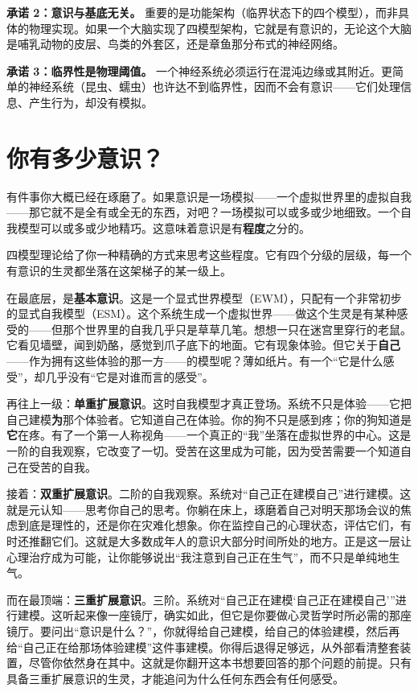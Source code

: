 \documentclass[11pt, twoside, openright]{book}
\begin{document}
\textbf{承诺 2：意识与基底无关。} 重要的是功能架构（临界状态下的四个模型），而非具体的物理实现。如果一个大脑实现了四模型架构，它就是有意识的，无论这个大脑是哺乳动物的皮层、鸟类的外套区，还是章鱼那分布式的神经网络。

\textbf{承诺 3：临界性是物理阈值。} 一个神经系统必须运行在混沌边缘或其附近。更简单的神经系统（昆虫、蠕虫）也许达不到临界性，因而不会有意识------它们处理信息、产生行为，却没有模拟。

\section*{你有多少意识？}

有件事你大概已经在琢磨了。如果意识是一场模拟------一个虚拟世界里的虚拟自我------那它就不是全有或全无的东西，对吧？一场模拟可以或多或少地细致。一个自我模型可以或多或少地精巧。这意味着意识是有\textbf{程度}之分的。

四模型理论给了你一种精确的方式来思考这些程度。它有四个分级的层级，每一个有意识的生灵都坐落在这架梯子的某一级上。

在最底层，是\textbf{基本意识}。这是一个显式世界模型（EWM），只配有一个非常初步的显式自我模型（ESM）。这个系统生成一个虚拟世界------做这个生灵是有某种感受的------但那个世界里的自我几乎只是草草几笔。想想一只在迷宫里穿行的老鼠。它看见墙壁，闻到奶酪，感觉到爪子底下的地面。它有现象体验。但它关于\textbf{自己}------作为拥有这些体验的那一方------的模型呢？薄如纸片。有一个“它是什么感受”，却几乎没有“它是对谁而言的感受”。

再往上一级：\textbf{单重扩展意识}。这时自我模型才真正登场。系统不只是体验------它把自己建模\textbf{为}那个体验者。它知道自己在体验。你的狗不只是感到疼；你的狗知道是\textbf{它}在疼。有了一个第一人称视角------一个真正的“我”坐落在虚拟世界的中心。这是一阶的自我观察，它改变了一切。受苦在这里成为可能，因为受苦需要一个知道自己在受苦的自我。

接着：\textbf{双重扩展意识}。二阶的自我观察。系统对“自己正在建模自己”进行建模。这就是元认知------思考你自己的思考。你躺在床上，琢磨着自己对明天那场会议的焦虑到底是理性的，还是你在灾难化想象。你在监控自己的心理状态，评估它们，有时还推翻它们。这就是大多数成年人的意识大部分时间所处的地方。正是这一层让心理治疗成为可能，让你能够说出“我注意到自己正在生气”，而不只是单纯地生气。

而在最顶端：\textbf{三重扩展意识}。三阶。系统对“自己正在建模‘自己正在建模自己’”进行建模。这听起来像一座镜厅，确实如此，但它是你要做心灵哲学时所必需的那座镜厅。要问出“意识是什么？”，你就得给自己建模，给自己的体验建模，然后再给“自己正在给那场体验建模”这件事建模。你得后退得足够远，从外部看清整套装置，尽管你依然身在其中。这就是你翻开这本书想要回答的那个问题的前提。只有具备三重扩展意识的生灵，才能追问为什么任何东西会有任何感受。
\end{document}

